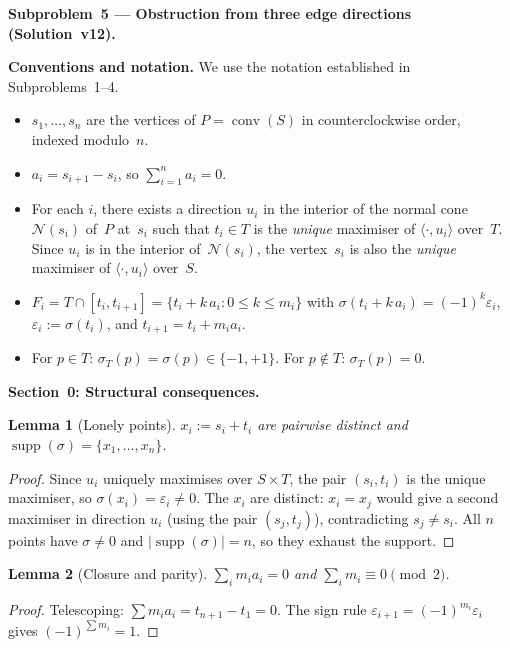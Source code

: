\documentclass{article}
\newtheorem{lemma}{Lemma}
\begin{document}
\textbf{Subproblem~5 --- Obstruction from three edge directions (Solution~v12).}

\medskip
\noindent\textbf{Conventions and notation.}
We use the notation established in Subproblems~1--4.
\begin{itemize}
  \item $s_1,\dots,s_n$ are the vertices of $P=\operatorname{conv}(S)$ in counterclockwise
        order, indexed modulo~$n$.
  \item $a_i = s_{i+1}-s_i$, so $\sum_{i=1}^n a_i = 0$.
  \item For each $i$, there exists a direction $u_i$ in the interior of the normal cone
        $\mathcal{N}(s_i)$ of~$P$ at~$s_i$ such that $t_i\in T$ is the \emph{unique}
        maximiser of $\langle\cdot,u_i\rangle$ over~$T$.
        Since $u_i$ is in the interior of~$\mathcal{N}(s_i)$, the vertex~$s_i$ is
        also the \emph{unique} maximiser of $\langle\cdot,u_i\rangle$ over~$S$.
  \item $F_i = T\cap[t_i,t_{i+1}]=\{t_i+k\,a_i:0\le k\le m_i\}$ with
        $\sigma(t_i+k\,a_i)=(-1)^k\varepsilon_i$, $\varepsilon_i:=\sigma(t_i)$,
        and $t_{i+1}=t_i+m_i a_i$.
  \item For $p\in T$: $\sigma_T(p)=\sigma(p)\in\{-1,+1\}$.
        For $p\notin T$: $\sigma_T(p)=0$.
\end{itemize}

\bigskip
\noindent\textbf{Section~0: Structural consequences.}

\begin{lemma}[Lonely points]\label{lem:lonely}
$x_i:=s_i+t_i$ are pairwise distinct and
$\operatorname{supp}(\sigma)=\{x_1,\dots,x_n\}$.
\end{lemma}
\begin{proof}
Since $u_i$ uniquely maximises over $S\times T$, the pair $(s_i,t_i)$ is the unique maximiser,
so $\sigma(x_i)=\varepsilon_i\ne 0$.  The $x_i$ are distinct: $x_i=x_j$ would give a second
maximiser in direction $u_i$ (using the pair $(s_j,t_j)$), contradicting $s_j\ne s_i$.
All $n$ points have $\sigma\ne 0$ and $|\operatorname{supp}(\sigma)|=n$, so they exhaust the support.
\end{proof}

\begin{lemma}[Closure and parity]\label{lem:closure}
$\sum_{i}m_i a_i=0$ and $\sum_i m_i\equiv 0\pmod{2}$.
\end{lemma}
\begin{proof}
Telescoping: $\sum m_i a_i=t_{n+1}-t_1=0$.
The sign rule $\varepsilon_{i+1}=(-1)^{m_i}\varepsilon_i$ gives $(-1)^{\sum m_i}=1$.
\end{proof}
\end{document}
